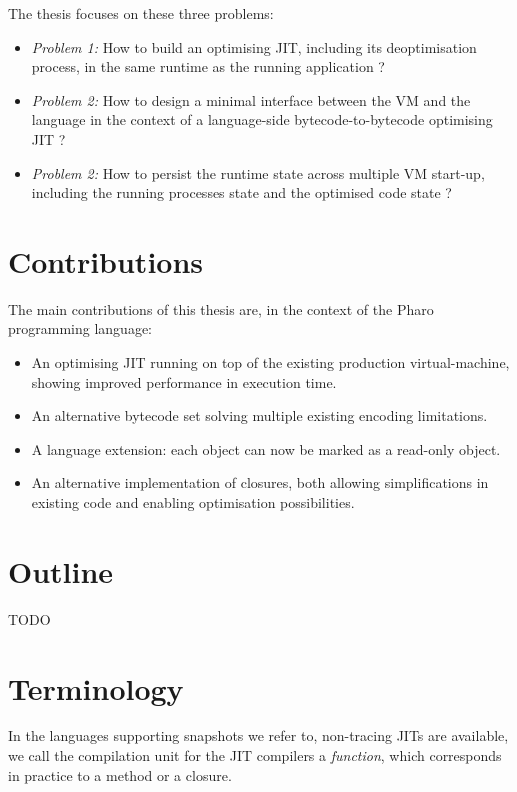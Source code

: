 \documentclass[a4paper,12pt,twoside]{../includes/ThesisStyle}
\begin{document}
The thesis focuses on these three problems:

\begin{itemize}
	\item \emph{Problem 1:} How to build an optimising JIT, including its deoptimisation process, in the same runtime as the running application ?
	\item \emph{Problem 2:} How to design a minimal interface between the VM and the language in the context of a language-side bytecode-to-bytecode optimising JIT ?
	\item \emph{Problem 2:} How to persist the runtime state across multiple VM start-up, including the running processes state and the optimised code state ?
\end{itemize}

\section{Contributions}

The main contributions of this thesis are, in the context of the Pharo programming language:
\begin{itemize}
	\item An optimising JIT running on top of the existing production virtual-machine, showing improved performance in execution time.
	\item An alternative bytecode set solving multiple existing encoding limitations.
	\item A language extension: each object can now be marked as a read-only object.
	\item An alternative implementation of closures, both allowing simplifications in existing code and enabling optimisation possibilities.
\end{itemize}

\section{Outline}

TODO

\section{Terminology}
In the languages supporting snapshots we refer to, non-tracing JITs are available, we call the compilation unit for the JIT compilers a \emph{function}, which corresponds in practice to a method or a closure.

\ifx\wholebook\relax\else
    
\end{document}
